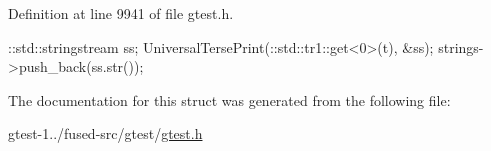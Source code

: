 \-Definition at line 9941 of file gtest.\-h.


\begin{DoxyCode}
                                                                          {
    ::std::stringstream ss;
    UniversalTersePrint(::std::tr1::get<0>(t), &ss);
    strings->push_back(ss.str());
  }
\end{DoxyCode}


\-The documentation for this struct was generated from the following file\-:\begin{DoxyCompactItemize}
\item 
gtest-\/1../fused-\/src/gtest/\hyperlink{fused-src_2gtest_2gtest_8h}{gtest.\-h}\end{DoxyCompactItemize}
